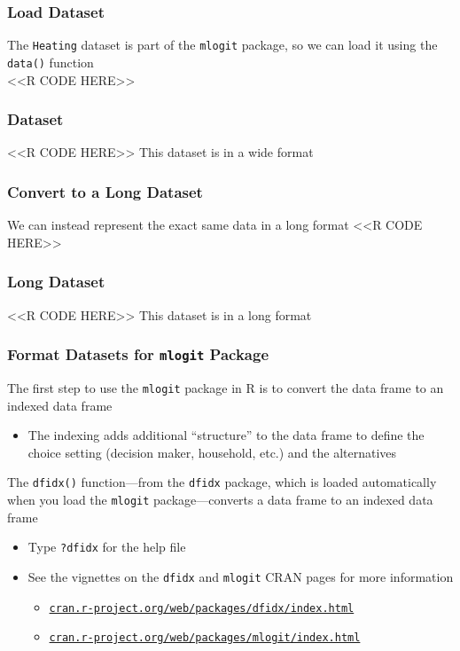 \documentclass{beamer}
\begin{document}
\begin{frame}[fragile]\frametitle{Load Dataset}
    The \texttt{Heating} dataset is part of the \texttt{mlogit} package, so we can load it using the \texttt{data()} function \\
    <<R CODE HERE>>
\end{frame}

\begin{frame}[fragile]\frametitle{Dataset}
    <<R CODE HERE>>
    \vspace{2ex}
    This dataset is in a wide format
\end{frame}

\begin{frame}[fragile]\frametitle{Convert to a Long Dataset}
	We can instead represent the exact same data in a long format
    <<R CODE HERE>>
\end{frame}

\begin{frame}[fragile]\frametitle{Long Dataset}
    <<R CODE HERE>>
    \vspace{2ex}
    This dataset is in a long format
\end{frame}

\begin{frame}\frametitle{Format Datasets for \texttt{mlogit} Package}
    The first step to use the \texttt{mlogit} package in R is to convert the data frame to an indexed data frame
    \begin{itemize}
    	\item The indexing adds additional ``structure'' to the data frame to define the choice setting (decision maker, household, etc.) and the alternatives
    \end{itemize}
    \vspace{2ex}
    The \texttt{dfidx()} function---from the \texttt{dfidx} package, which is loaded automatically when you load the \texttt{mlogit} package---converts a data frame to an indexed data frame
    \begin{itemize}
    	\item Type \texttt{?dfidx} for the help file
    	\item See the vignettes on the \texttt{dfidx} and \texttt{mlogit} CRAN pages for more information
    	\begin{itemize}
    		\item \href{https://cran.r-project.org/web/packages/dfidx/index.html}{\texttt{cran.r-project.org/web/packages/dfidx/index.html}}
    		\item \href{https://cran.r-project.org/web/packages/mlogit/index.html}{\texttt{cran.r-project.org/web/packages/mlogit/index.html}}
    	\end{itemize}
    \end{itemize}
\end{frame}
\end{document}
